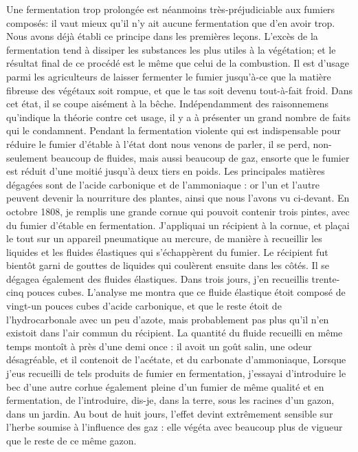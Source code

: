 Une fermentation trop prolongée est néanmoins très-préjudiciable aux fumiers composés: il vaut mieux qu'il n'y ait aucune fermentation que d'en avoir trop. Nous avons déjà établi ce principe dans les premières leçons. L'excès de la fermentation tend à dissiper les substances les plus utiles à la végétation; et le résultat final de ce procédé est le même que celui de la combustion.
Il est d'usage parmi les agriculteurs de laisser fermenter le fumier jusqu'à-ce que la matière fibreuse des végétaux soit rompue, et que le tas soit devenu tout-à-fait froid. Dans cet état, il se coupe aisément à la bêche.
Indépendamment des raisonnemens qu'indique la théorie contre cet usage, il y a à présenter un grand nombre de faits qui le condamnent.
Pendant la fermentation violente qui est indispensable pour réduire le fumier d'étable à l'état dont nous venons de parler, il se perd, non-seulement beaucoup de fluides, mais aussi beaucoup de gaz, ensorte\setcounter{page}{203} que le fumier est réduit d'une moitié jusqu'à deux tiers en poids. Les principales matières dégagées sont de l'acide carbonique et de l'ammoniaque : or l'un et l'autre peuvent devenir la nourriture des plantes, ainsi que nous l'avons vu ci-devant.
En octobre 1808, je remplis une grande cornue qui pouvoit contenir trois pintes, avec du fumier d'étable en fermentation. J'appliquai un récipient à la cornue, et plaçai le tout sur un appareil pneumatique au mercure, de manière à recueillir les liquides et les fluides élastiques qui s'échappèrent du fumier. Le récipient fut bientôt garni de gouttes de liquides qui coulèrent ensuite dans les côtés. Il se dégagea également des fluides élastiques. Dans trois jours, j'en recueillis trente-cinq pouces cubes. L'analyse me montra que ce fluide élastique étoit composé de vingt-un pouces cubes d'acide carbonique, et que le reste étoit de l'hydrocarbonale avec un peu d'azote, mais probablement pas plus qu'il n'en existoit dans l'air commun du récipient. La quantité du fluide recueilli en même temps montoît à près d'une demi once : il avoit un goût salin, une odeur désagréable, et il contenoit de l'acétate, et du carbonate d'ammoniaque,\setcounter{page}{204} Lorsque j'eus recueilli de tels produits de fumier en fermentation, j'essayai d'introduire le bec d'une autre corhue également pleine d'un fumier de même qualité et en fermentation, de l'introduire, dis-je, dans la terre, sous les racines d'un gazon, dans un jardin. Au bout de huit jours, l'effet devint extrêmement sensible sur l'herbe soumise à l'influence des gaz : elle végéta avec beaucoup plus de vigueur que le reste de ce même gazon.
